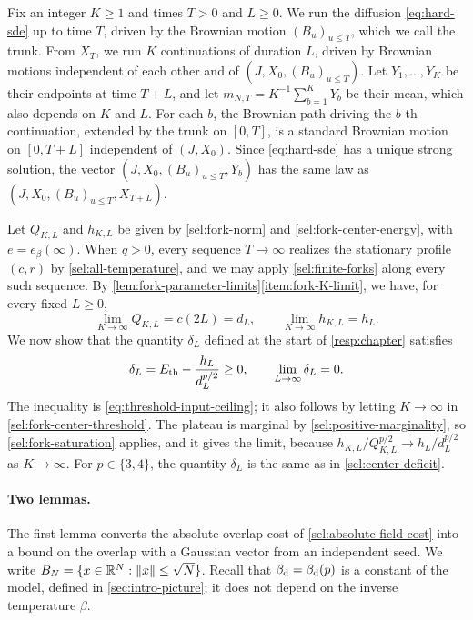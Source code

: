 Fix an integer $K\ge1$ and times $T>0$ and $L\ge0$. We run the diffusion \eqref{eq:hard-sde} up to time $T$, driven by the Brownian motion $(B_u)_{u\le T}$, which we call the trunk. From $X_T$, we run $K$ continuations of duration $L$, driven by Brownian motions independent of each other and of $(J,X_0,(B_u)_{u\le T})$. Let $Y_1,\dots,Y_K$ be their endpoints at time $T+L$, and let $m_{N,T}=K^{-1}\sum_{b=1}^KY_b$ be their mean, which also depends on $K$ and $L$. For each $b$, the Brownian path driving the $b$-th continuation, extended by the trunk on $[0,T]$, is a standard Brownian motion on $[0,T+L]$ independent of $(J,X_0)$. Since \eqref{eq:hard-sde} has a unique strong solution, the vector $(J,X_0,(B_u)_{u\le T},Y_b)$ has the same law as $(J,X_0,(B_u)_{u\le T},X_{T+L})$.

Let $Q_{K,L}$ and $h_{K,L}$ be given by \eqref{sel:fork-norm} and \eqref{sel:fork-center-energy}, with $e=e_\beta(\infty)$. When $q>0$, every sequence $T\to\infty$ realizes the stationary profile $(c,r)$ by \cref{sel:all-temperature}, and we may apply \cref{sel:finite-forks} along every such sequence. By \cref{lem:fork-parameter-limits}\ref{item:fork-K-limit}, we have, for every fixed $L\ge0$,
\[
 \lim_{K\to\infty}Q_{K,L}=c(2L)=d_L,\qquad \lim_{K\to\infty}h_{K,L}=h_L.
\]
We now show that the quantity $\delta_L$ defined at the start of \cref{resp:chapter} satisfies
\begin{equation}
 \delta_L=E_{\mathrm{th}}-\frac{h_L}{d_L^{p/2}}\ge0,
 \qquad \lim_{L\to\infty}\delta_L=0.
 \label{resp:p-center-deficit}
\end{equation}
The inequality is \eqref{eq:threshold-input-ceiling}; it also follows by letting $K\to\infty$ in \eqref{sel:fork-center-threshold}. The plateau is marginal by \cref{sel:positive-marginality}, so \eqref{sel:fork-saturation} applies, and it gives the limit, because $h_{K,L}/Q_{K,L}^{p/2}\to h_L/d_L^{p/2}$ as $K\to\infty$. For $p\in\{3,4\}$, the quantity $\delta_L$ is the same as in \eqref{sel:center-deficit}.

\paragraph{Two lemmas.}
The first lemma converts the absolute-overlap cost of \cref{sel:absolute-field-cost} into a bound on the overlap with a Gaussian vector from an independent seed. We write $B_N=\{x\in\mathbb R^N:\lVert x\rVert\le\sqrt N\}$. Recall that $\beta_{\mathrm d}=\beta_{\mathrm d}(p)$ is a constant of the model, defined in \cref{sec:intro-picture}; it does not depend on the inverse temperature $\beta$.

